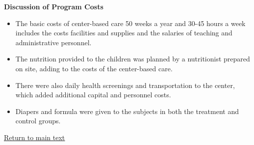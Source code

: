 \documentclass[static]{JJH-Beamer}
\begin{document}
\begin{frame}
 \addtocounter{framenumber}{-1}
\hypertarget{jorge}{}

\begin{center}
\textbf{Discussion of Program Costs}
\end{center}

\begin{itemize}
\item The basic costs of center-based care 50 weeks a year and 30-45 hours a week includes the costs facilities and supplies and the salaries of teaching and administrative personnel.
\item The nutrition provided to the children was planned by a nutritionist prepared on site, adding to the costs of the center-based care.
\item There were also daily health screenings and transportation to the center, which added additional capital and personnel costs.
\item Diapers and formula were given to the subjects in both the treatment and control groups.
\end{itemize}

\end{frame}

\begin{frame}
 \addtocounter{framenumber}{-1}

\begin{center}
\hyperlink{ret:jorge}{\underline{Return to main text}}
\end{center}

\end{frame}
\end{document}
